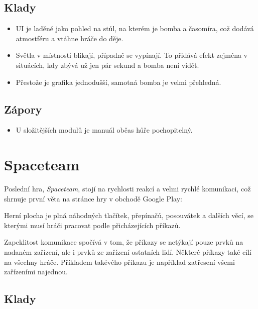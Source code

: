 \FloatBarrier

\subsection*{Klady}

\begin{itemize}
    \item UI je laděné jako pohled na stůl, na kterém je bomba a časomíra,
což dodává atmostféru a vtáhne hráče do děje.
    \item Světla v místnosti blikají, případně se vypínají.
To přidává efekt zejména v situácích,
kdy zbývá už jen pár sekund a bomba není vidět.
    \item Přestože je grafika jednodušší, samotná bomba je velmi přehledná.
\end{itemize}

\subsection*{Zápory}

\begin{itemize}
    \item U složitějších modulů je manuál občas hůře pochopitelný.
\end{itemize}

\section{Spaceteam}

Poslední hra, \emph{Spaceteam}, stojí na rychlosti reakcí a velmi rychlé
komunikaci, což shrnuje první věta na stránce hry \cite{henrysmithinc_spaceteam}
v obchodě Google Play: 

Herní plocha je plná náhodných tlačítek, přepínačů, posouvátek a dalších věcí,
se kterými musí hráči pracovat podle přicházejících příkazů.

Zapeklitost komunikace spočívá v tom,
že příkazy se netýkají pouze prvků na nadaném zařízení,
ale i prvků ze zařízení ostatních lidí.
Některé příkazy také cílí na všechny hráče.
Příkladem takévého příkazu je například zatřesení všemi zařízeními najednou.

\FloatBarrier

\subsection*{Klady}


